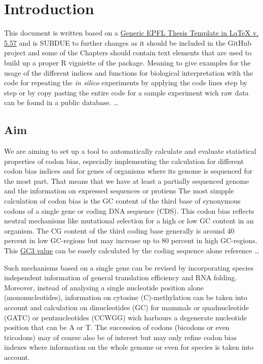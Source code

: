 \chapter*{Introduction}
This document is written based on a \href{http://phd.epfl.ch/thesistemplates}{Generic EPFL Thesis Template in LaTeX v. 5.57} and is SUBDUE to further changes as it should be included in the GitHub project and some of the Chapters should contain text elements that are used to build up a proper R vigniette of the package. Meaning to give examples for the usage of the different indices and functions for biological interpretation with the code for repeating the \textit{in silico} experiments by applying the code lines step by step or by copy pasting the entire code for a sample experiment wich raw data can be found in a public database.     \dots

\section{Aim}
We are aiming to set up a tool to automatically calculate and evaluate statistical properties of codon bias, especially implementing the calculation for different codon bias indices and for genes of organisms where its genome is sequenced for the most part. That means that we have at least a partially sequenced genome and the information on expressed sequences or protiens
The most simpple calculation of codon bias is the GC content of the third base of synonymous codons of a single gene or coding DNA sequence (CDS). This codon bias reflects neutral mechanisms like mutational selection for a high or low GC content in an organism. The CG content of the third coding base generally is around 40 percent in low GC-regions but may increase up to 80 percent in high GC-regions. This \hyperlink{function:G3C}{GC3 value} can be easely calculated by the coding sequence alone
reference \cite{Galtier2001} \dots

Such mechanisms based on a single gene can be revised by incorporating species independent information of general translation efficiency and RNA folding. Moreover, instead of analysing a single nucleotide position alone (mononucleotides), information on cytosine (C)-methylation can be taken into account and calculation on dinucleotides (GC) for mammals or quadnucleotide (GATC) or pentnucleotides (CCWGG) wich harbours a degenerate nucleotide position that can be A or T. The succession of codons (bicodons or even tricodons) may of course also be of interest but may only refine codon bias indexes where information on the whole genome or even for species is taken into account.

